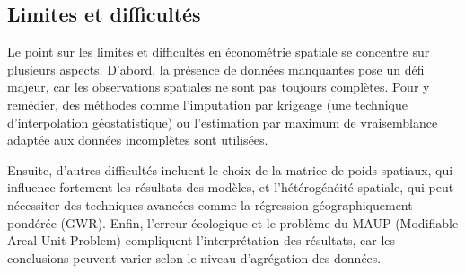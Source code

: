 \documentclass[
]{article}
\begin{document}
\subsection{Limites et difficultés}\label{limites-et-difficultuxe9s}

Le point sur les limites et difficultés en économétrie spatiale se
concentre sur plusieurs aspects. D'abord, la présence de données
manquantes pose un défi majeur, car les observations spatiales ne sont
pas toujours complètes. Pour y remédier, des méthodes comme l'imputation
par krigeage (une technique d'interpolation géostatistique) ou
l'estimation par maximum de vraisemblance adaptée aux données
incomplètes sont utilisées.

Ensuite, d'autres difficultés incluent le choix de la matrice de poids
spatiaux, qui influence fortement les résultats des modèles, et
l'hétérogénéité spatiale, qui peut nécessiter des techniques avancées
comme la régression géographiquement pondérée (GWR). Enfin, l'erreur
écologique et le problème du MAUP (Modifiable Areal Unit Problem)
compliquent l'interprétation des résultats, car les conclusions peuvent
varier selon le niveau d'agrégation des données.
\end{document}
